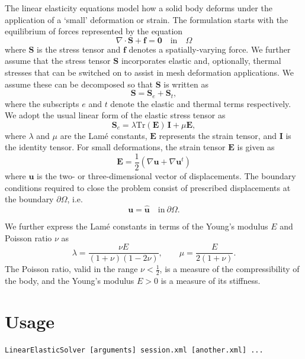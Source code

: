 The linear elasticity equations model how a solid body deforms under the
application of a `small' deformation or strain. The formulation starts with the
equilibrium of forces represented by the equation
%
\begin{equation}
\nabla \cdot \mathbf{S} + \mathbf{f} = \mathbf{0} \quad \textrm{in} \quad \Omega
\label{eq:strong}
\end{equation}
%
where $\mathbf{S}$ is the stress tensor and $\mathbf{f}$ denotes a
spatially-varying force. We further assume that the stress tensor $\mathbf{S}$
incorporates elastic and, optionally, thermal stresses that can be switched on
to assist in mesh deformation applications. We assume these can be decomposed so
that $\mathbf{S}$ is written as
%
\[
\mathbf{S} = \mathbf{S}_e + \mathbf{S}_t,
\]
%
where the subscripts $e$ and $t$ denote the elastic and thermal terms
respectively. We adopt the usual linear form of the elastic stress tensor as
%
\[
\mathbf{S}_e = \lambda\mbox{Tr}(\mathbf{E}) \, \mathbf{I} +\mu \mathbf{E},
\]
%
where $\lambda$ and $\mu$ are the Lam\'e constants, $\mathbf{E}$ represents the
strain tensor, and $\mathbf{I}$ is the identity tensor. For small deformations,
the strain tensor $\mathbf{E}$ is given as
%
\begin{equation}
\mathbf{E} =\frac{1}{2} \left ( \nabla \mathbf{u}+ \nabla \mathbf{u}^t \right )
\end{equation}
%
where $\mathbf{u}$ is the two- or three-dimensional vector of displacements. The
boundary conditions required to close the problem consist of prescribed
displacements at the boundary $\partial \Omega$, i.e.
\begin{equation}
  \mathbf{u} = \hat{\mathbf{u}} \quad \textrm{in}\ \partial \Omega.
\end{equation}

We further express the Lam\'e constants in terms of the Young's modulus $E$ and
Poisson ratio $\nu$ as
%
\[
\lambda = \frac{\nu E}{(1+\nu)(1-2\nu)}, \qquad \mu = \frac{E}{2(1+\nu)}.
\]
%
The Poisson ratio, valid in the range $\nu < \tfrac{1}{2}$, is a measure of the
compressibility of the body, and the Young's modulus $E > 0$ is a measure of its
stiffness.

\section{Usage}
\begin{lstlisting}[style=BashInputStyle]
LinearElasticSolver [arguments] session.xml [another.xml] ...
\end{lstlisting}

